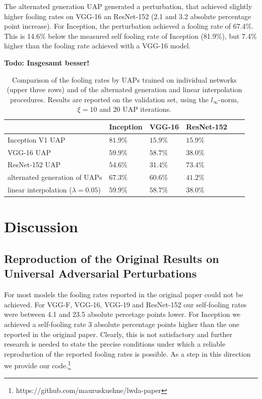 \documentclass[runningheads]{llncs}
\begin{document}
The alternated generation UAP generated a perturbation, that achieved slightly higher fooling rates on VGG-16 an ResNet-152 (2.1 and 3.2 absolute percentage point increase). For Inception, the perturbation achieved a fooling rate of 67.4\%. This is 14.6\% below the measured self fooling rate of Inception (81.9\%), but 7.4\% higher than the fooling rate achieved with a VGG-16 model. 

{\bf Todo: Insgesamt besser!}



\begin{table}[]\label{tab:alternatedgeneration}
\centering
\caption{Comparison of the fooling rates by UAPs trained on individual networks (upper three rows) and of the alternated generation and linear interpolation procedures. Results are reported on the validation set, using the $l_\infty$-norm, $\xi=10$ and 20 UAP iterations. }

\begin{tabular}{|l|l|l|l|l|l|}
\hline

											&	Inception	&	VGG-16		&	ResNet-152		\\ \hline
Inception V1 UAP							&	\(81.9\%\)		&	\(15.9\%\)	&	\(15.9\%\)		\\
VGG-16 UAP								&	\(59.9\%\)		&	\(58.7\%\)	&	\(38.0\%\)		\\
ResNet-152 UAP &	\(54.6\%\)		&	\(31.4\%\)	&	\(73.4\%\)		\\ \hline
alternated generation of UAPs&	\(67.3\%\)		&	\(60.6\%\)	&	\(41.2\%\)		\\
linear interpolation (\(\lambda=0.05\))	&	\(59.9\%\)		&	\(58.7\%\)	&	\(38.0\%\)		\\
\hline 
\end{tabular}
\label{tbl_vergleich_comb}
\end{table}


\section{Discussion}
\subsection{Reproduction of the Original Results on Universal Adversarial Perturbations}
For most models the fooling rates reported in the original paper could not be achieved. For VGG-F, VGG-16, VGG-19 and ResNet-152 our  self-fooling rates were between 4.1 and 23.5 absolute percetage points lower. For Inception we achieved a self-fooling rate 3 absolute percentage points higher than the one reported in the original paper. Clearly, this is not satisfactory and further research is needed to state the precise conditions under which a reliable reproduction of the reported fooling rates is possible. As a step in this direction we provide our code.\footnote{https://github.com/mauruskuehne/lwda-paper}
\end{document}
